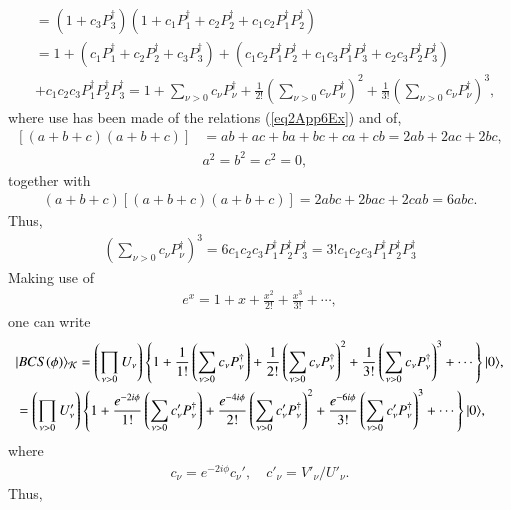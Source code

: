 \begin{subappendices}
\begin{align}
\nonumber &=\left(1+c_3P_3^\dagger\right)\left(1+c_1P_1^\dagger+c_2P_2^\dagger+c_1c_2P_1^\dagger P_2^\dagger\right)\\
\nonumber&=1+\left(c_1P_1^\dagger+c_2P_2^\dagger+c_3P_3^\dagger\right)+\left(c_1c_2P_1^\dagger P_2^\dagger+c_1c_3P_1^\dagger P_3^\dagger+c_2c_3P_2^\dagger P_3^\dagger\right)\\
&+c_1c_2c_3P_1^\dagger P_2^\dagger P_3^\dagger=1+\sum_{\nu>0}c_\nu P_\nu^\dagger + \frac{1}{2!}\left(\sum_{\nu>0}c_\nu P^\dagger_\nu\right)^2+\frac{1}{3!}\left(\sum_{\nu>0}c_\nu P^\dagger_\nu\right)^3,
\end{align}
where use has been made of the relations (\ref{eq2App6Ex}) and of,
\begin{align}
\nonumber \left[\left(a+b+c\right)\left(a+b+c\right)\right]&=ab+ac+ba +bc+ca+cb=2ab+2ac+2bc,\\
\nonumber & a^2=b^2=c^2=0,
\end{align}
together with
\begin{align}\label{eq2App9Ex}
 (a+b+c)\left[\left(a+b+c\right)\left(a+b+c\right)\right]=2abc+2bac+2cab=6abc.
\end{align}
Thus,
\begin{align}\label{eq2App10Ex}
\left(\sum_{\nu>0}c_\nu P_\nu^\dagger\right)^3=6c_1c_2c_3P_1^\dagger P_2^\dagger P_3^\dagger=3!c_1c_2c_3P_1^\dagger P_2^\dagger P_3^\dagger
\end{align}
Making use of
\begin{align}\label{eq2App11Ex}
e^x=1+x+\frac{x^2}{2!}+\frac{x^3}{3!}+\cdots,
\end{align}
one can write
\begin{align}\label{eq1App11Ex} 
\nonumber &|{BCS(\phi)} \rangle_{\mathcal K}=\left(\prod_{\nu>0}U_\nu\right)\left\{1+\frac{1}{1!}\left(\sum_{\nu>0}c_\nu P_\nu^\dagger\right)+\frac{1}{2!}\left(\sum_{\nu>0}c_\nu P_\nu^\dagger\right)^2+\frac{1}{3!}\left(\sum_{\nu>0}c_\nu P_\nu^\dagger\right)^3+\cdots\right\}|{0} \rangle,\\
&=\left(\prod_{\nu>0}U'_\nu\right)\left\{1+\frac{e^{-2i\phi}}{1!}\left(\sum_{\nu>0}c'_\nu P_\nu^\dagger\right)+\frac{e^{-4i\phi}}{2!}\left(\sum_{\nu>0}c'_\nu P_\nu^\dagger\right)^2+\frac{e^{-6i\phi}}{3!}\left(\sum_{\nu>0}c'_\nu P_\nu^\dagger\right)^3+\cdots\right\}|{0} \rangle,
\end{align}
where
\begin{align}\label{eq2App12Ex}
 c_\nu=e^{-2i\phi}c_\nu',\quad c'_\nu=V'_\nu/U'_\nu.
\end{align}
Thus,
\begin{align}\label{eq2App13Ex}

\end{align}
\end{subappendices}
